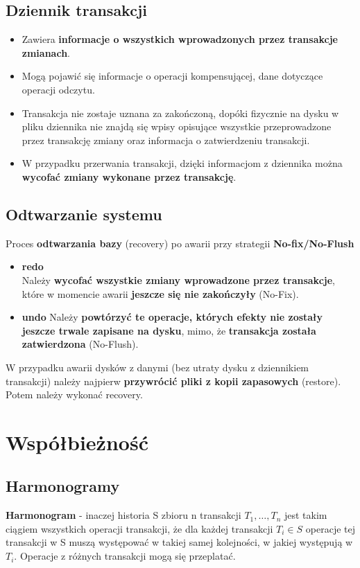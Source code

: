 \documentclass[a4paper]{article}
\begin{document}
\subsection{Dziennik transakcji}
\begin{itemize}
    \item Zawiera \textbf{informacje o wszystkich wprowadzonych przez transakcje zmianach}.
    \item Mogą pojawić się informacje o operacji kompensującej, dane dotyczące operacji odczytu.
    \item Transakcja nie zostaje uznana za zakończoną, dopóki fizycznie na dysku w pliku dziennika nie znajdą się wpisy opisujące wszystkie przeprowadzone przez transakcję zmiany oraz informacja o zatwierdzeniu transakcji.
    \item W przypadku przerwania transakcji, dzięki informacjom z dziennika można \textbf{wycofać zmiany wykonane przez transakcję}.
\end{itemize}

\subsection{Odtwarzanie systemu}
Proces \textbf{odtwarzania bazy} (recovery) po awarii przy strategii \textbf{No-fix/No-Flush}
\begin{itemize}
    \item \textbf{redo}\\
     Należy \textbf{wycofać wszystkie zmiany wprowadzone przez transakcje}, które w momencie awarii \textbf{jeszcze się nie zakończyły} (No-Fix).
    \item \textbf{undo}
    Należy \textbf{powtórzyć te operacje, których efekty nie zostały jeszcze trwale zapisane na dysku}, mimo, że \textbf{transakcja została zatwierdzona} (No-Flush).
\end{itemize}

W przypadku awarii dysków z danymi (bez utraty dysku z dziennikiem transakcji) należy najpierw \textbf{przywrócić pliki z kopii zapasowych} (restore). Potem należy wykonać recovery.

\section{Współbieżność}
\subsection{Harmonogramy}
\textbf{Harmonogram} - inaczej historia S zbioru n transakcji $T_1, \dots, T_n$ jest takim ciągiem wszystkich operacji transakcji, że dla każdej transakcji $T_i \in S$ operacje tej transakcji w S muszą występować w takiej samej kolejności, w jakiej występują w $T_i$. Operacje z różnych transakcji mogą się przeplatać.
\end{document}
